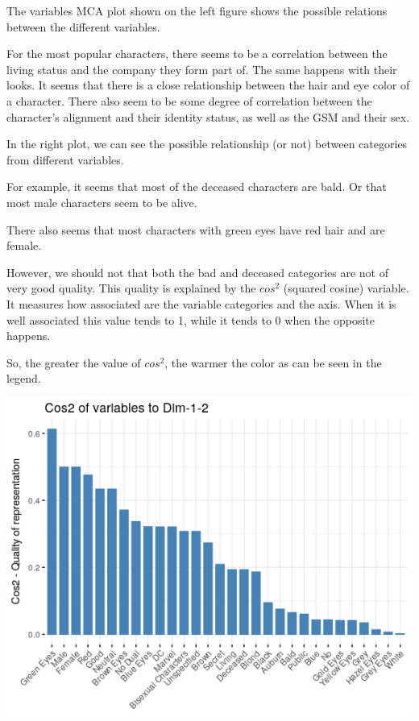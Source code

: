 \newpage
The variables MCA plot shown on the left figure shows the possible relations between the different variables.

For the most popular characters, there seems to be a correlation between the living status and the company they form part of. The same happens with their looks. It seems that there is a close relationship between the hair and eye color of a character. 
There also seem to be some degree of correlation between the character's alignment and their identity status, as well as the GSM and their sex.

In the right plot, we can see the possible relationship (or not) between categories from different variables.

For example, it seems that most of the deceased characters are bald. Or that most male characters seem to be alive.

There also seems that most characters with green eyes have red hair and are female.

However, we should not that both the bad and deceased categories are not of very good quality.
This quality is explained by the \textbf{$cos^2$} (squared cosine) variable. It measures how associated are the variable categories and the axis. When it is well associated this value tends to 1, while it tends to 0 when the opposite happens.

So, the greater the value of $cos^2$, the warmer the color as can be seen in the legend.
\begin{center}
   \includegraphics[scale=0.7]{img/cos2_quality.png}
\end{center}

